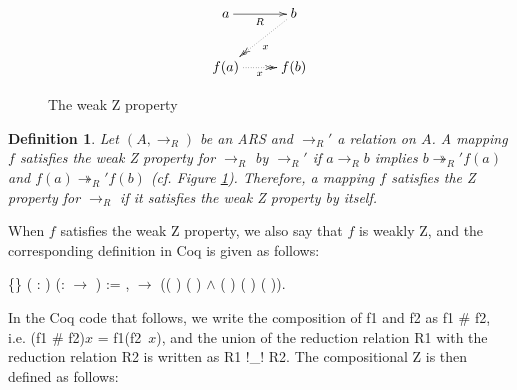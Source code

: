\documentclass[a4paper]{article}
\newcommand{\tto}{\twoheadrightarrow}
\newtheorem{definition}{Definition}[section]
\begin{document}
\begin{figure}[h] \centering \[ \xymatrix{ a \ar[r]_R & b
      \ar@{.>>}[dl]^x\\ f(a) \ar@{.>>}[r]_x & f(b) \\ } \]
  \caption{The weak Z property}\label{fig:weakZ}
\end{figure}

\begin{definition} Let $(A,\to_R)$ be an ARS and $\to_R'$ a
  relation on $A$. A mapping $f$ satisfies the {\it weak Z
    property} for $\to_R$ by $\to_R'$ if $a\to_R b$ implies $b \tto_R'
  f(a)$ and $f(a) \tto_R' f(b)$ (cf. Figure
  \ref{fig:weakZ}). Therefore, a mapping $f$ satisfies the Z
  property for $\to_R$ if it satisfies the weak Z property by
  itself.
\end{definition}

When $f$ satisfies the weak Z property, we also say that $f$ is weakly
Z, and the corresponding definition in Coq is given as
follows: \begin{coqdoccode} \coqdocemptyline \coqdocnoindent
    \{\}
  ( :  )
  (:  \ensuremath{\rightarrow}
  ) := \coqdockw{\ensuremath{\forall}} 
  ,   
  \ensuremath{\rightarrow} (( )
   ( ) \ensuremath{\land}
  ( ) ( )
  ( )).\coqdoceol \coqdocemptyline
\end{coqdoccode}

In the Coq code that follows, we write the composition of f1 and f2 as
f1 \# f2, i.e. (f1 \# f2)$x$ = f1(f2\ $x$), and the union of the
reduction relation R1 with the reduction relation R2 is written as R1
!\_! R2. The compositional Z is then defined as follows:
\end{document}
